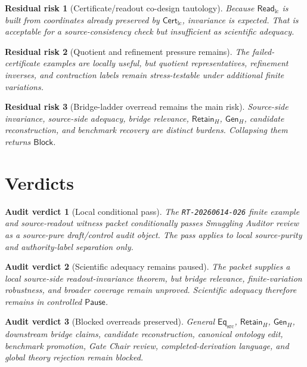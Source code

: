 \documentclass[11pt]{article}
\newcommand{\EqSrc}{\mathsf{Eq}_{\mathrm{src}}}
\newcommand{\CertLC}{\mathsf{Cert}_{\mathrm{lc}}}
\newcommand{\ReadLC}{\mathsf{Read}_{\mathrm{lc}}}
\newcommand{\RetainH}{\mathsf{Retain}_{H}}
\newcommand{\GenH}{\mathsf{Gen}_{H}}
\newcommand{\Block}{\mathsf{Block}}
\newcommand{\Pause}{\mathsf{Pause}}
\newtheorem{residualrisk}{Residual risk}
\newtheorem{verdict}{Audit verdict}
\begin{document}
\begin{residualrisk}[Certificate/readout co-design tautology]
Because \(\ReadLC\) is built from coordinates already preserved by
\(\CertLC\), invariance is expected. That is acceptable for a
source-consistency check but insufficient as scientific adequacy.
\end{residualrisk}

\begin{residualrisk}[Quotient and refinement pressure remains]
The failed-certificate examples are locally useful, but quotient
representatives, refinement inverses, and contraction labels remain
stress-testable under additional finite variations.
\end{residualrisk}

\begin{residualrisk}[Bridge-ladder overread remains the main risk]
Source-side invariance, source-side adequacy, bridge relevance,
\(\RetainH\), \(\GenH\), candidate reconstruction, and benchmark
recovery are distinct burdens. Collapsing them returns \(\Block\).
\end{residualrisk}

\section{Verdicts}

\begin{verdict}[Local conditional pass]
The \texttt{RT-20260614-026} finite example and source-readout witness
packet conditionally passes Smuggling Auditor review as a source-pure
draft/control audit object. The pass applies to local source-purity and
authority-label separation only.
\end{verdict}

\begin{verdict}[Scientific adequacy remains paused]
The packet supplies a local source-side readout-invariance theorem, but
bridge relevance, finite-variation robustness, and broader coverage
remain unproved. Scientific adequacy therefore remains in controlled
\(\Pause\).
\end{verdict}

\begin{verdict}[Blocked overreads preserved]
General \(\EqSrc\), \(\RetainH\), \(\GenH\), downstream bridge claims,
candidate reconstruction, canonical ontology edit, benchmark promotion,
Gate Chair review, completed-derivation language, and global theory
rejection remain blocked.
\end{verdict}
\end{document}
